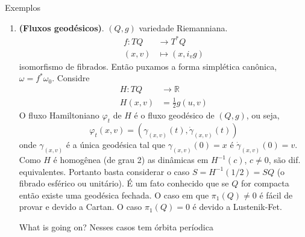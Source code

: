 \begin{thing4}{Exemplos}
\begin{enumerate}
Portanto, basta considerar $S=H^{-1}(1)$. Como
\[X^{(z)}_H=J\nabla H(z)=J\left( \frac{2}{r_1}z_1,\ldots,\frac{2}{r_n}z_n \right),\]
o fluxo de $X_H$ é
\[\varphi_t(z_1,\ldots,z_n)=\left( e^{t\frac{i}{r_1}}z_1,\ldots,e^{t\frac{i}{r_n}}z_n\right) \]
Consequentemente, temos ao menos $n$ orbitas periodicas em $S$ dadas por
\[\gamma_j(t)=(0,\ldots,0,z_j(t),0,\ldots,0)\]
onde $z_j(t)=e^{t\frac{i}{r_j}}z$. De fato, existem duas possíveis situações:
\begin{itemize}
\item $r_1,\ldots,r_n$ são \textit{\textbf{racionalmente independentes}}, ou seja,
	\[\left<(r_1,\ldots,r_n,v\right>\neq 0\qquad \forall v \in\mathbb{Z}^n\setminus\{0\}\]
	(geometricamente signfica que a linha determinada pelo vetor não toca a lattice $\mathbb{Z}^n$). Neste caso, não existem outras órbias periódicas.	
\item $r_1,\ldots,r_n$ são racionalmente dependentes. Neste caso, existem infinitas órbitas periódicas. 
\end{itemize}
\begin{exercise}\leavevmode
	Prove estas afirmações.
\end{exercise}
\item \textbf{(Fluxos geodésicos)}.\hspace{1em} $(Q,g)$ variedade Riemanniana.
	\begin{align*}
		f: TQ &\longrightarrow T^*Q \\
		(x,v) &\longmapsto (x,i_{v}g)
	\end{align*}
	isomorfismo de fibrados. Então puxamos a forma simplética canônica, $\omega=f^* \omega_0$. Considre
	\begin{align*}
		H: TQ &\longrightarrow \mathbb{R} \\
		H(x,v) &=\frac{1}{2}g(u,v)
	\end{align*}
O fluxo Hamiltoniano $\varphi_t$ de $H$ é o fluxo geodésico de $(Q,g)$, ou seja,
\[\varphi_t(x,v)=\left( \gamma_{(x,v)}(t),\dot{\gamma}_{(x,v)}(t) \right) \]
onde $\gamma_{(x,v)}$ é a única geodésica tal que $\gamma_{(x,v)}(0)=x$ é $\dot{\gamma}_{(x,v)}(0)=v$.
Como $H$ é homogênea (de grau 2) as dinâmicas em $H^{-1}(c)$, $c\neq 0$, são dif. equivalentes. Portanto basta considerar o caso $S=H^{-1}(1/2)=SQ$ (o fibrado esférico ou unitário). É um fato conhecido que se $Q$ for compacta então existe uma geodésica fechada. O caso em que $\pi_{1}(Q)\neq 0$ é fácil de provar e devido a Cartan. O caso $\pi_{1}(Q)=0$ é devido a Lustenik-Fet.

\begin{thing4}{What is going on?}\leavevmode
	Nesses casos tem órbita períodica
\end{thing4}


\end{enumerate}
\end{thing4}
